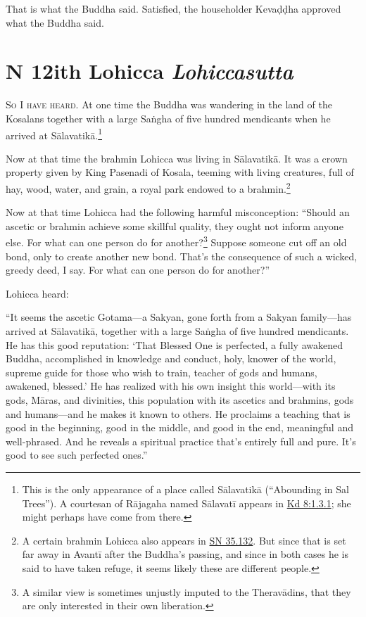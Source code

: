 \documentclass[12pt,openany]{book}%
\newcommand*{\suttatitleacronym}[1]{\smaller[2]{#1}\vspace*{.3em}}
\newcommand*{\suttatitletranslation}[1]{\linebreak{#1}}
\newcommand*{\suttatitleroot}[1]{\linebreak\smaller[2]\itshape{#1}}
\newcommand*{\tocacronym}[1]{\hspace*{-3.3em}{#1}\quad}
\newcommand*{\toctranslation}[1]{#1}
\newcommand*{\tocroot}[1]{(\textit{#1})}
\newcommand*{\scevam}[1]{\textsc{#1}}
\renewcommand*{\tocacronym}[1]{\hspace*{0em}{#1}\quad}%
\begin{document}
That is what the Buddha said. Satisfied, the householder \textsanskrit{Kevaḍḍha} approved what the Buddha said. 

%
\chapter*{{\suttatitleacronym DN 12}{\suttatitletranslation With Lohicca }{\suttatitleroot Lohiccasutta}}
\addcontentsline{toc}{chapter}{\tocacronym{DN 12} \toctranslation{With Lohicca } \tocroot{Lohiccasutta}}

\scevam{So I have heard. }At one time the Buddha was wandering in the land of the Kosalans together with a large \textsanskrit{Saṅgha} of five hundred mendicants when he arrived at \textsanskrit{Sālavatikā}.\footnote{This is the only appearance of a place called \textsanskrit{Sālavatikā} (“Abounding in Sal Trees”). A courtesan of \textsanskrit{Rājagaha} named \textsanskrit{Sālavatī} appears in \href{https://suttacentral.net/pli-tv-kd8/en/sujato\#1.3.1}{Kd 8:1.3.1}; she might perhaps have come from there. } 

Now at that time the brahmin Lohicca was living in \textsanskrit{Sālavatikā}. It was a crown property given by King Pasenadi of Kosala, teeming with living creatures, full of hay, wood, water, and grain, a royal park endowed to a brahmin.\footnote{A certain brahmin Lohicca also appears in \href{https://suttacentral.net/sn35.132/en/sujato}{SN 35.132}. But since that is set far away in \textsanskrit{Avantī} after the Buddha’s passing, and since in both cases he is said to have taken refuge, it seems likely these are different people. } 

Now at that time Lohicca had the following harmful misconception: “Should an ascetic or brahmin achieve some skillful quality, they ought not inform anyone else. For what can one person do for another?\footnote{A similar view is sometimes unjustly imputed to the \textsanskrit{Theravādins}, that they are only interested in their own liberation. } Suppose someone cut off an old bond, only to create another new bond. That’s the consequence of such a wicked, greedy deed, I say. For what can one person do for another?” 

Lohicca heard: 

“It seems the ascetic Gotama—a Sakyan, gone forth from a Sakyan family—has arrived at \textsanskrit{Sālavatikā}, together with a large \textsanskrit{Saṅgha} of five hundred mendicants. He has this good reputation: ‘That Blessed One is perfected, a fully awakened Buddha, accomplished in knowledge and conduct, holy, knower of the world, supreme guide for those who wish to train, teacher of gods and humans, awakened, blessed.’ He has realized with his own insight this world—with its gods, \textsanskrit{Māras}, and divinities, this population with its ascetics and brahmins, gods and humans—and he makes it known to others. He proclaims a teaching that is good in the beginning, good in the middle, and good in the end, meaningful and well-phrased. And he reveals a spiritual practice that’s entirely full and pure. It’s good to see such perfected ones.” 
\end{document}
